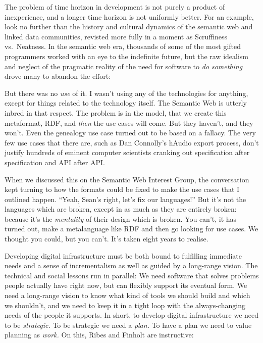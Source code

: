\documentclass[11pt]{article}
\begin{document}
\begin{multicols}{2}
The problem of time horizon in development is not purely a product of
inexperience, and a longer time horizon is not uniformly better. For an
example, look no further than the history and cultural dynamics of the
semantic web and linked data communities, revisted more fully in a
moment as Scruffiness vs.~Neatness. In the semantic web era, thousands
of some of the most gifted programmers worked with an eye to the
indefinite future, but the raw idealism and neglect of the pragmatic
reality of the need for software to \emph{do something} drove many to
abandon the effort:

\begin{leftbar}
But there was no \emph{use} of it. I wasn't using any of the
technologies for anything, except for things related to the technology
itself. The Semantic Web is utterly inbred in that respect. The problem
is in the model, that we create this metaformat, RDF, and \emph{then}
the use cases will come. But they haven't, and they won't. Even the
genealogy use case turned out to be based on a fallacy. The very few use
cases that there are, such as Dan Connolly's hAudio export process,
don't justify hundreds of eminent computer scientists cranking out
specification after specification and API after API.

When we discussed this on the Semantic Web Interest Group, the
conversation kept turning to how the formats could be fixed to make the
use cases that I outlined happen. ``Yeah, Sean's right, let's fix our
languages!'' But it's not the languages which are broken, except in as
much as they are entirely broken: because it's the \emph{mentality} of
their design which is broken. You can't, it has turned out, make a
metalanguage like RDF and then go looking for use cases. We thought you
could, but you can't. It's taken eight years to realise. \cite{palmerDitchingSemanticWeb2008} 
\end{leftbar}

Developing digital infrastructure must be both bound to fulfilling
immediate needs and a sense of incrementalism as well as guided by a
long-range vision. The technical and social lessons run in parallel: We
need software that solves problems people actually have right now, but
can flexibly support its eventual form. We need a long-range vision to
know what kind of tools we should build and which we shouldn't, and we
need to keep it in a tight loop with the always-changing needs of the
people it supports. In short, to develop digital infrastructure we need
to be \emph{strategic.} To be strategic we need a \emph{plan.} To have a
plan we need to value planning as \emph{work.} On this, Ribes and
Finholt are instructive:


\end{multicols}
\end{document}
